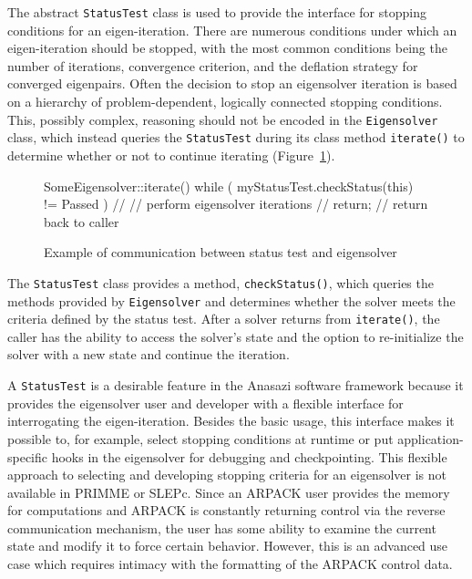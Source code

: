 \documentclass[acmtoms,acmnow]{acmtrans2m}
\newcommand{\aspace}[1]{\texttt{#1}}
\begin{document}
The abstract \aspace{StatusTest} class is used to provide the interface for stopping 
conditions for an eigen-iteration. There are numerous conditions under which an eigen-iteration 
should be stopped, with the most common conditions being the number of iterations,
convergence criterion, and the deflation strategy for converged eigenpairs.
Often the decision to stop an eigensolver iteration is based on a hierarchy 
of problem-dependent, logically connected stopping conditions.
This, possibly complex, reasoning should not be encoded in the \aspace{Eigensolver} class,
which instead queries the \aspace{StatusTest} during its class method \aspace{iterate()} to determine 
whether or not to continue iterating (Figure~\ref{fig:comm}).
\begin{figure}[htb]
\begin{center}
\begin{boxedverbatim}
SomeEigensolver::iterate() {
  while ( myStatusTest.checkStatus(this) != Passed ) {
    //
    // perform eigensolver iterations
    //
  }
  return;  // return back to caller
}
\end{boxedverbatim}
\end{center}
\caption{Example of communication between status test and eigensolver}
\label{fig:comm}
\end{figure}
The \aspace{StatusTest} class provides a method, \verb!checkStatus()!, which queries the methods provided by
\aspace{Eigensolver} and determines whether the solver meets the criteria defined by the 
status test. After a solver returns from \verb!iterate()!, the caller has the ability to access the
solver's state and the option to re-initialize the solver with a new state and continue
the iteration.

A \aspace{StatusTest} is a desirable feature in the Anasazi software framework because it
provides the eigensolver user and developer with a flexible interface for interrogating
the eigen-iteration. Besides the basic usage, this interface makes it possible to, for
example, select stopping conditions at runtime or put application-specific hooks in the
eigensolver for debugging and checkpointing. This flexible approach to selecting and
developing stopping criteria for an eigensolver is not available in PRIMME or SLEPc.
Since an ARPACK user provides the memory for computations and ARPACK is constantly
returning control via the reverse communication mechanism, the user has some ability to
examine the current state and modify it to force certain behavior. However, this is an
advanced use case which requires intimacy with the formatting of the ARPACK control data.
\end{document}
